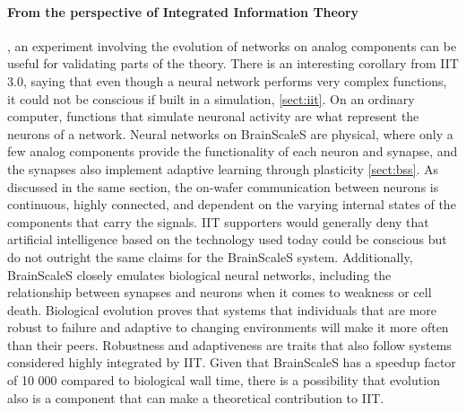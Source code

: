 \paragraph{From the perspective of Integrated Information Theory}, an experiment involving the evolution of networks on analog components can be useful for validating parts of the theory.
There is an interesting corollary from IIT 3.0, saying that even though a neural network performs very complex functions, it could not be conscious if built in a simulation, \vref{sect:iit}. On an ordinary computer, functions that simulate neuronal activity are what represent the neurons of a network.
Neural networks on BrainScaleS are physical, where only a few analog components provide the functionality of each neuron and synapse, and the synapses also implement adaptive learning through plasticity \vref{sect:bss}.
As discussed in the same section, the on-wafer communication between neurons is continuous, highly connected, and dependent on the varying internal states of the components that carry the signals.
IIT supporters would generally deny that artificial intelligence based on the technology used today could be conscious but do not outright the same claims for the BrainScaleS system.
Additionally, BrainScaleS closely emulates biological neural networks, including the relationship between synapses and neurons when it comes to weakness or cell death.
Biological evolution proves that systems that individuals that are more robust to failure and adaptive to changing environments will make it more often than their peers.
Robustness and adaptiveness are traits that also follow systems considered highly integrated by IIT.
Given that BrainScaleS has a speedup factor of 10 000 compared to biological wall time, there is a possibility that evolution also is a component that can make a theoretical contribution to IIT.

